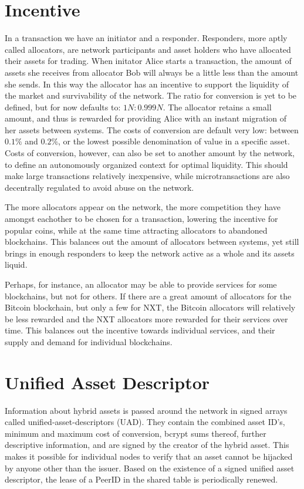 \documentclass[11pt, a4paper]{article}
\begin{document}
\section{Incentive}

In a transaction we have an initiator and a responder. Responders, more aptly called allocators, are network participants and asset holders who have allocated their assets for trading. When initator Alice starts a transaction, the amount of assets she receives from allocator Bob will always be a little less than the amount she sends. In this way the allocator has an incentive to support the liquidity of the market and survivability of the network. The ratio for conversion is yet to be defined, but for now defaults to: $1N : 0.999N$.  The allocator retains a small amount, and thus is rewarded for providing Alice with an instant migration of her assets between systems. The costs of conversion are default very low: between $0.1\%$ and $0.2\%$, or the lowest possible denomination of value in a specific asset. Costs of conversion, however, can also be set to another amount by the network, to define an autonomously organized context for optimal liquidity. This should make large transactions relatively inexpensive, while microtransactions are also decentrally regulated to avoid abuse on the network.

The more allocators appear on the network, the more competition they have amongst eachother to be chosen for a transaction, lowering the incentive for popular coins, while at the same time attracting allocators to abandoned blockchains. This balances out the amount of allocators between systems, yet still brings in enough responders to keep the network active as a whole and its assets liquid.

Perhaps, for instance, an allocator may be able to provide services for some blockchains, but not for others. If there are a great amount of allocators for the Bitcoin blockchain, but only a few for NXT, the Bitcoin allocators will relatively be less rewarded and the NXT allocators more rewarded for their services over time. This balances out the incentive towards individual services, and their supply and demand for individual blockchains.


\section{Unified Asset Descriptor}

Information about hybrid assets is passed around the network in signed arrays called unified-asset-descriptors (UAD). They contain the combined asset ID's, minimum and maximum cost of conversion, bcrypt sums thereof, further descriptive information, and are signed by the creator of the hybrid asset. This makes it possible for individual nodes to verify that an asset cannot be hijacked by anyone other than the issuer. Based on the existence of a signed unified asset descriptor, the lease of a PeerID in the shared table is periodically renewed.
\end{document}
